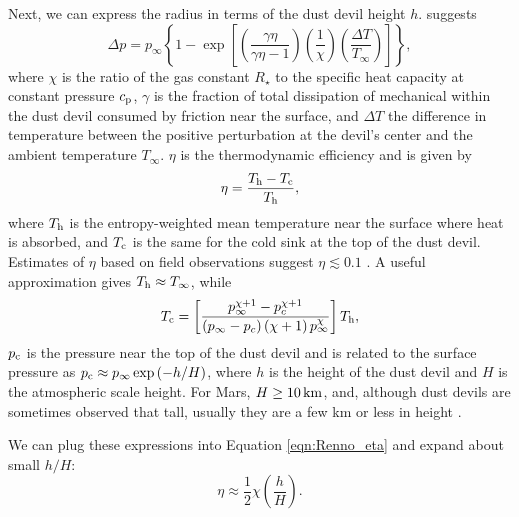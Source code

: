 \documentclass{aastex63}
\begin{document}
Next, we can express the radius in terms of the dust devil height $h$. \citet{1998JAtS...55.3244R} suggests
\begin{equation}
    \Delta p = p_{\infty} \left\{ 1 - \exp \left[ \left( \dfrac{\gamma \eta}{\gamma \eta - 1}\right) \left(\dfrac{1}{\chi}\right) \left( \dfrac{\Delta T}{T_{\infty}}\right) \right] \right\}\label{eqn:Renno_Delta-p},
\end{equation}{}
where $\chi$ is the ratio of the gas constant $R_\star$ to the specific heat capacity at constant pressure $c_{\rm p}$, $\gamma$ is the fraction of total dissipation of mechanical within the dust devil consumed by friction near the surface, and $\Delta T$ the difference in temperature between the positive perturbation at the devil's center and the ambient temperature $T_\infty$. $\eta$ is the thermodynamic efficiency and is given by 
\begin{equation}
    \eta = \dfrac{T_{\rm h} - T_{\rm c}}{T_{\rm h}}\label{eqn:Renno_eta},
\end{equation}{}
where $T_{\rm h}$ is the entropy-weighted mean temperature near the surface where heat is absorbed, and $T_{\rm c}$ is the same for the cold sink at the top of the dust devil. Estimates of $\eta$ based on field observations suggest $\eta \lesssim 0.1$ \citep[e.g.][]{2000JGR...105.1859R}. A useful approximation gives $T_{\rm h} \approx T_\infty$, while
\begin{equation}
    T_{\rm c} = \left[ \dfrac{ p_\infty^{\chi + 1} - p_{c}^{\chi + 1} }{\left( p_\infty - p_{c} \right) \left( \chi + 1\right) p_\infty^{\chi}} \right] T_{\rm h},\label{eqn:Tc}
\end{equation}{} 
$p_{\rm c}$ is the pressure near the top of the dust devil and is related to the surface pressure as $p_{\rm c} \approx p_\infty \exp\left(-h/H\right)$, where $h$ is the height of the dust devil and $H$ is the atmospheric scale height. For Mars, $H \ge 10\,{\rm km}$, and, although dust devils are sometimes observed that tall, usually they are a few km or less in height \citep{2008Icar..197...39S}. 

We can plug these expressions into Equation \ref{eqn:Renno_eta} and expand about small $h/H$:
\begin{equation}
    \eta \approx \frac{1}{2} \chi \left( \dfrac{h}{H} \right).\label{eqn:approx_eta}
\end{equation}{}
\end{document}
